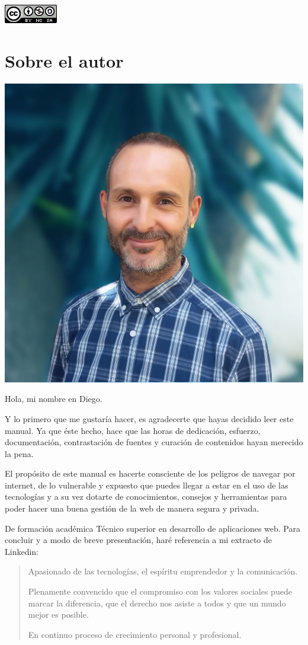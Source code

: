 \documentclass[
  a4paper,
  openany]{book}
\begin{document}
\begin{flushleft}\includegraphics{images/by-nc-sa-88x31} \end{flushleft}

\hypertarget{autor}{%
\chapter*{Sobre el autor}\label{autor}}

\begin{flushleft}\includegraphics[width=0.25\linewidth]{images/diego-chiquero-2020-profile} \end{flushleft}

Hola, mi nombre en Diego.

Y lo primero que me gustaría hacer, es agradecerte que hayas decidido leer este manual. Ya que éste hecho, hace que las horas de dedicación, esfuerzo, documentación, contrastación de fuentes y curación de contenidos hayan merecido la pena.

El propósito de este manual es hacerte consciente de los peligros de navegar por internet, de lo vulnerable y expuesto que puedes llegar a estar en el uso de las tecnologías y a su vez dotarte de conocimientos, consejos y herramientas para poder hacer una buena gestión de la web de manera segura y privada.

De formación académica Técnico superior en desarrollo de aplicaciones web.
Para concluir y a modo de breve presentación, haré referencia a mi extracto de Linkedin:

\begin{quote}
Apasionado de las tecnologías, el espíritu emprendedor y la comunicación.

Plenamente convencido que el compromiso con los valores sociales puede marcar la diferencia, que el derecho nos asiste a todos y que un mundo mejor es posible.

En continuo proceso de crecimiento personal y profesional.
\end{quote}
\end{document}
